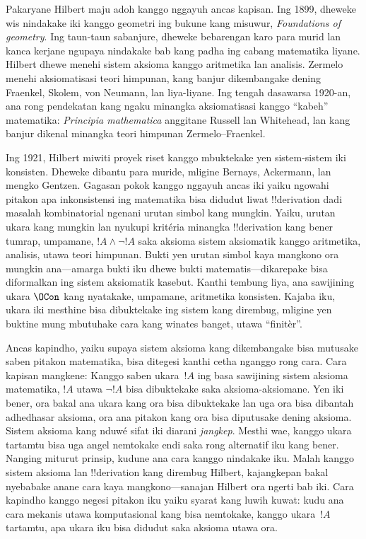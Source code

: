 \documentclass[../../../include/open-logic-section]{subfiles}
\begin{document}
Pakaryane Hilbert maju adoh kanggo nggayuh ancas
kapisan. Ing 1899, dheweke wis nindakake iki
kanggo geometri ing bukune kang misuwur,
\emph{Foundations of geometry}. Ing taun-taun
sabanjure, dheweke bebarengan karo para murid
lan kanca kerjane ngupaya nindakake bab kang padha
ing cabang matematika liyane. Hilbert dhewe
menehi sistem aksioma kanggo aritmetika lan analisis.
Zermelo menehi aksiomatisasi teori himpunan, kang
banjur dikembangake dening Fraenkel, Skolem,
von Neumann, lan liya-liyane. Ing tengah
dasawarsa 1920-an, ana rong pendekatan kang
ngaku minangka aksiomatisasi kanggo ``kabeh''
matematika: \emph{Principia mathematica}
anggitane Russell lan Whitehead, lan kang banjur
dikenal minangka teori himpunan Zermelo--Fraenkel.

Ing 1921, Hilbert miwiti proyek riset kanggo
mbuktekake yen sistem-sistem iki konsisten.
Dheweke dibantu para muride, mligine Bernays,
Ackermann, lan mengko Gentzen. Gagasan pokok
kanggo nggayuh ancas iki yaiku ngowahi pitakon
apa inkonsistensi ing matematika bisa didudut
liwat !!{derivation} dadi masalah kombinatorial
ngenani urutan simbol kang mungkin. Yaiku,
urutan ukara kang mungkin lan nyukupi kritéria
minangka !!{derivation} kang bener tumrap,
umpamane, $!A \land \lnot !A$ saka aksioma
sistem aksiomatik kanggo aritmetika, analisis,
utawa teori himpunan. Bukti yen urutan simbol
kaya mangkono ora mungkin ana---amarga bukti iku
dhewe bukti matematis---dikarepake bisa diformalkan ing
sistem aksiomatik kasebut. Kanthi tembung liya,
ana sawijining ukara $\OCon$ kang nyatakake,
umpamane, aritmetika konsisten. Kajaba iku,
ukara iki mesthine bisa dibuktekake ing sistem
kang dirembug, mligine yen buktine mung mbutuhake
cara kang winates banget, utawa ``finitèr''.

Ancas kapindho, yaiku supaya sistem aksioma kang
dikembangake bisa mutusake saben pitakon matematika,
bisa ditegesi kanthi cetha nganggo rong cara.
Cara kapisan mangkene: Kanggo saben ukara~$!A$
ing basa sawijining sistem aksioma matematika,
$!A$ utawa $\lnot !A$ bisa dibuktekake saka
aksioma-aksiomane. Yen iki bener, ora bakal ana
ukara kang ora bisa dibuktekake lan uga ora bisa
dibantah adhedhasar aksioma, ora ana pitakon
kang ora bisa diputusake dening aksioma. Sistem
aksioma kang nduwé sifat iki diarani \emph{jangkep}.
Mesthi wae, kanggo ukara tartamtu bisa uga angel
nemtokake endi saka rong alternatif iku kang bener.
Nanging miturut prinsip, kudune ana cara kanggo
nindakake iku. Malah kanggo sistem aksioma lan
!!{derivation} kang dirembug Hilbert, kajangkepan
bakal nyebabake anane cara kaya mangkono---sanajan
Hilbert ora ngerti bab iki. Cara kapindho kanggo
negesi pitakon iku yaiku syarat kang luwih kuwat:
kudu ana cara mekanis utawa komputasional kang
bisa nemtokake, kanggo ukara~$!A$ tartamtu,
apa ukara iku bisa didudut saka aksioma utawa ora.
\end{document}
